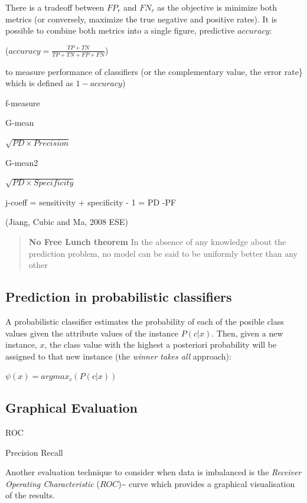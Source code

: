 \documentclass[]{book}
\begin{document}
There is a tradeoff between \(FP_r\) and \(FN_r\) as the objective is
minimize both metrics (or conversely, maximize the true negative and
positive rates). It is possible to combine both metrics into a single
figure, predictive \(accuracy\):

(\(accuracy = \frac{TP + TN}{TP + TN + FP + FN}\))

to measure performance of classifiers (or the complementary value, the
error rate\} which is defined as \(1-accuracy\))

f-measure

G-mean

\(\sqrt{PD \times Precision}\)

G-mean2

\(\sqrt{PD \times Specificity}\)

j-coeff = sensitivity + specificity - 1 = PD -PF

(Jiang, Cubic and Ma, 2008 ESE)

\begin{quote}
\textbf{No Free Lunch theorem} In the absence of any knowledge about the
prediction problem, no model can be said to be uniformly better than any
other
\end{quote}

\subsection{Prediction in probabilistic
classifiers}\label{prediction-in-probabilistic-classifiers}

A probabilistic classifier estimates the probability of each of the
posible class values given the attribute values of the instance
\(P(c|{x})\). Then, given a new instance, \({x}\), the class value with
the highest a posteriori probability will be assigned to that new
instance (the \emph{winner takes all} approach):

\(\psi({x}) = argmax_c (P(c|{x}))\)

\subsection{Graphical Evaluation}\label{graphical-evaluation}

ROC

Precision Recall

Another evaluation technique to consider when data is imbalanced is the
\emph{Receiver Operating Characteristic}
(\(ROC\))\textasciitilde{}\cite{Fawcett2006} curve which provides a
graphical visualisation of the results.
\end{document}
